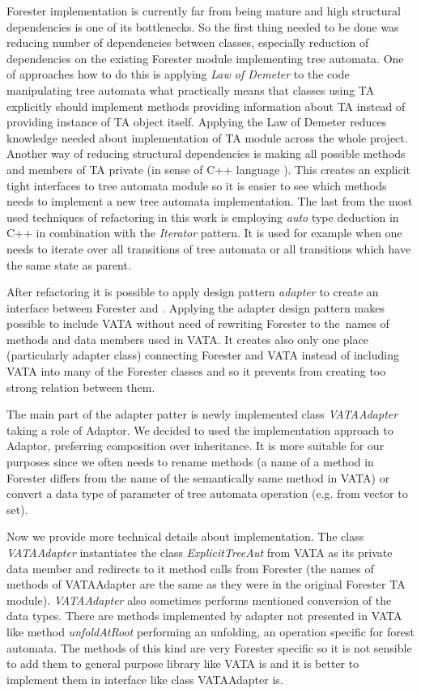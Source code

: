 \documentclass[fleqn,11pt]{ExcelAtFIT} %
\begin{document}
Forester implementation is currently far from being mature and
high structural dependencies is one of its bottlenecks.
So the first thing needed to be done was reducing number of dependencies between classes,
especially reduction of dependencies on the existing Forester module implementing tree automata.
One of approaches how to do this is applying \emph{Law of Demeter} \cite{lod89} to the code manipulating tree automata what practically
means that classes using TA explicitly should implement methods providing information about TA instead of providing instance of TA object itself.
Applying the Law of Demeter reduces knowledge needed about implementation of TA module across the whole project.
Another way of reducing structural dependencies is making all possible methods and members of TA private (in sense of C++ language \cite{stroustrup13}).
This creates an explicit tight interfaces to tree automata module so it is easier to see which methods needs to implement
a new tree automata implementation.
The last from the most used techniques of refactoring in this work is employing \emph{auto} type deduction in C++ in combination
with the \emph{Iterator} pattern.
It is used for example when one needs to iterate over all transitions of tree automata or all transitions which
have the same state as parent.

After refactoring it is possible to apply design pattern \emph{adapter} \cite{gamma95} to create
an interface between Forester and \vata.
Applying the adapter design pattern makes possible to include VATA without need of rewriting
Forester to the~names of methods and data members used in VATA.
It creates also only one place (particularly adapter class) connecting Forester and VATA instead of
including VATA into many of the Forester classes and so it prevents from creating too strong relation between them.

The main part of the adapter patter is newly implemented class \emph{VATAAdapter} taking a role of Adaptor.
We decided to used the implementation approach to Adaptor, preferring composition over inheritance.
It is more suitable for our purposes since we often needs to rename methods 
(a name of a method in Forester differs from the name of the semantically same method in VATA)
or convert a data type of parameter of tree automata operation (e.g. from vector to set). 

Now we provide more technical details about implementation.
The class \emph{VATAAdapter} instantiates the class \emph{ExplicitTreeAut} from VATA as its private data member
and redirects to it method calls from Forester (the names of methods of VATAAdapter are the same as they were
in the original Forester TA module).
\emph{VATAAdapter} also sometimes performs mentioned conversion of the data types.
There are methods implemented by adapter not presented in VATA like method \emph{unfoldAtRoot}
performing an unfolding, an operation specific for forest automata.
The methods of this kind are very Forester specific so it is not sensible to add them to general purpose library like VATA is
and it is better to implement them in interface like class VATAAdapter is.
\end{document}
